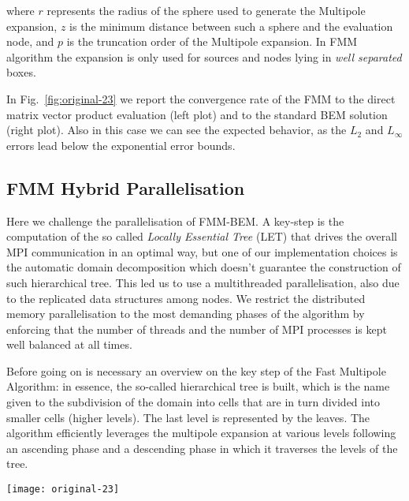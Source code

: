 where $r$ represents the radius of the sphere used to generate the Multipole expansion, $z$ is
the minimum distance between such a sphere and the evaluation node, and $p$ is the truncation order of the Multipole expansion. In FMM algorithm the expansion is only used for sources and nodes lying in \emph{well separated} boxes.

In Fig.~\ref{fig:original-23} we report the convergence rate of the FMM to the direct matrix vector product evaluation (left plot) and to the standard BEM solution (right plot). Also in this case we can see the expected behavior, as the $L_2$ and $L_\infty$ errors lead below the exponential error bounds.

\subsection{FMM Hybrid Parallelisation}
\label{sub:fmm_hybrid_parallelisation}

Here we challenge the parallelisation of FMM-BEM. A key-step is the computation of the so called \emph{Locally Essential Tree} (LET) that drives the overall MPI communication in an optimal way, but one of our implementation choices is the automatic domain decomposition which doesn’t guarantee the construction of such hierarchical tree. This led us to use a multithreaded parallelisation, also due to the
replicated data structures among nodes. We restrict the
distributed memory parallelisation to the most demanding phases of the algorithm by enforcing that the number of threads and the number of MPI processes is kept well balanced at all times. 

Before going on is necessary an overview on the key step of the Fast Multipole Algorithm: in essence, the so-called hierarchical tree is built, which is the name given to the subdivision of the domain into cells that are in turn divided into smaller cells (higher levels).
The last level is represented by the leaves. The algorithm efficiently leverages the multipole expansion at various levels following an ascending phase and a descending phase in which it traverses the levels of the tree. 

\begin{figure*}[!htp]
\begin{center}
    \texttt{[image: original-23]}    %
    \caption{Convergence analysis for the Multiple expansion using 486 unknowns on the pyramid test case. On the left we report the error of a single matrix vector multiplication, on the right we plot the error on the overall solution.} 
    \label{fig:original-23}
\end{center}
\end{figure*}

